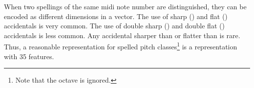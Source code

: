 
When two spellings of the same \gls{midi} note number are
distinguished, they can be encoded as different dimensions
in a vector. The use of sharp (\musSharp{}) and flat
(\musFlat{}) accidentals is very common. The use of double
sharp (\musDoubleSharp{}) and double flat (\musDoubleFlat{})
accidentals is less common. Any accidental sharper than
\musDoubleSharp{} or flatter than \musDoubleFlat{} is rare.
Thus, a reasonable representation for spelled pitch
classes\footnote{Note that the octave is ignored.} is a
representation with 35 features.

